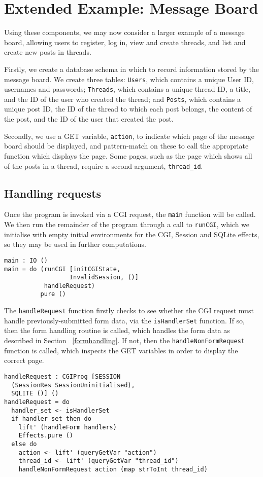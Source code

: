 \documentclass[preprint]{sigplanconf}
\begin{document}

\section{Extended Example: Message Board}
\label{messageboard}
Using these components, we may now consider a larger example of a message board, allowing users to register, log in, view and create threads, and list and create new posts in threads. 

Firstly, we create a database schema in which to record information stored by the message board. We create three tables: \texttt{Users}, which contains a unique User ID, usernames and passwords; \texttt{Threads}, which contains a unique thread ID, a title, and the ID of the user who created the thread; and \texttt{Posts}, which contains a unique post ID, the ID of the thread to which each post belongs, the content of the post, and the ID of the user that created the post.

Secondly, we use a GET variable, \texttt{action}, to indicate which page of the message board should be displayed, and pattern-match on these to call the appropriate function which displays the page. Some pages, such as the page which shows all of the posts in a thread, require a second argument, \texttt{thread\_id}. 
\subsection{Handling requests}
Once the program is invoked via a CGI request, the \texttt{main} function will be called. We then run the remainder of the program through a call to \texttt{runCGI}, which we initialise with empty initial environments for the CGI, Session and SQLite effects, so they may be used in further computations. 

{\small
\begin{verbatim}
main : IO ()
main = do (runCGI [initCGIState, 
                  InvalidSession, ()] 
           handleRequest)
          pure ()
\end{verbatim}
}
The \texttt{handleRequest} function firstly checks to see whether the CGI request must handle previously-submitted form data, via the \texttt{isHandlerSet} function. If so, then the form handling routine is called, which handles the form data as described in Section ~\ref{formhandling}. If not, then the \texttt{handleNonFormRequest} function is called, which inspects the GET variables in order to display the correct page.
{\small
\begin{verbatim}
handleRequest : CGIProg [SESSION 
  (SessionRes SessionUninitialised), 
  SQLITE ()] ()
handleRequest = do 
  handler_set <- isHandlerSet
  if handler_set then do
    lift' (handleForm handlers)
    Effects.pure ()
  else do
    action <- lift' (queryGetVar "action")
    thread_id <- lift' (queryGetVar "thread_id")
    handleNonFormRequest action (map strToInt thread_id)
\end{verbatim}
}
\end{document}
